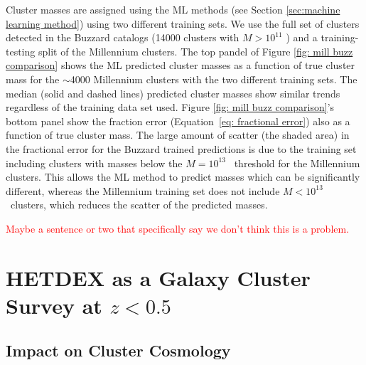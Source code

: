 \documentclass[fleqn,usenatbib]{mnras}
\newcommand{\editorial}[1]{\textcolor{red}{#1}}
\begin{document}
Cluster masses are assigned using the ML methods (see Section \ref{sec:machine learning method}) using two different training sets. We use the full set of clusters detected in the Buzzard catalogs (14000 clusters with $M > 10^{11}$ \msol) and a training-testing split of the Millennium clusters. The top pandel of Figure \ref{fig: mill buzz comparison} shows the ML predicted cluster masses as a function of true cluster mass for the $\sim$4000 Millennium clusters with the two different training sets. The median (solid and dashed lines) predicted cluster masses show similar trends regardless of the training data set used. Figure \ref{fig: mill buzz comparison}'s bottom panel show the fraction error (Equation~\ref{eq: fractional error}) also as a function of true cluster mass. The large amount of scatter (the shaded area) in the fractional error for the Buzzard trained predictions is due to the training set including clusters with masses below the $M = 10^{13}$ \Msol\ threshold for the Millennium clusters. This allows the ML method to predict masses which can be significantly different, whereas the Millennium training set does not include $M < 10^{13}$ \Msol\ clusters, which reduces the scatter of the predicted masses.

\editorial{Maybe a sentence or two that specifically say we don't think this is a problem.}
 
\section{HETDEX as a Galaxy Cluster Survey at $z < 0.5$}\label{sec:discussion}

\subsection{Impact on Cluster Cosmology}
\end{document}
